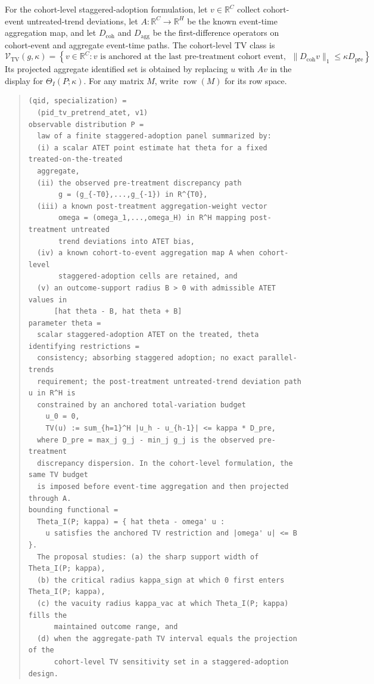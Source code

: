 \documentclass[11pt]{article}
\newcommand{\R}{\mathbb{R}}
\theoremstyle{definition}
\theoremstyle{plain}
\theoremstyle{remark}
\begin{document}
For the cohort-level staggered-adoption formulation, let \(v\in\R^{C}\) collect cohort-event untreated-trend deviations, let \(A:\R^C\to\R^H\) be the known event-time aggregation map, and let \(D_{\mathrm{coh}}\) and \(D_{\mathrm{agg}}\) be the first-difference operators on cohort-event and aggregate event-time paths. The cohort-level TV class is
\[
\mathcal V_{\mathrm{TV}}(g,\kappa)
=
\left\{
v\in\R^C:
v \text{ is anchored at the last pre-treatment cohort event, }\;
\|D_{\mathrm{coh}}v\|_1\le \kappa D_{\mathrm{pre}}
\right\}.
\]
Its projected aggregate identified set is obtained by replacing \(u\) with \(Av\) in the display for \(\Theta_I(P;\kappa)\). For any matrix \(M\), write \(\operatorname{row}(M)\) for its row space.

\begin{quote}
\begin{verbatim}
(qid, specialization) =
  (pid_tv_pretrend_atet, v1)
observable distribution P =
  law of a finite staggered-adoption panel summarized by:
  (i) a scalar ATET point estimate hat theta for a fixed treated-on-the-treated
  aggregate,
  (ii) the observed pre-treatment discrepancy path
       g = (g_{-T0},...,g_{-1}) in R^{T0},
  (iii) a known post-treatment aggregation-weight vector
       omega = (omega_1,...,omega_H) in R^H mapping post-treatment untreated
       trend deviations into ATET bias,
  (iv) a known cohort-to-event aggregation map A when cohort-level
       staggered-adoption cells are retained, and
  (v) an outcome-support radius B > 0 with admissible ATET values in
      [hat theta - B, hat theta + B]
parameter theta =
  scalar staggered-adoption ATET on the treated, theta
identifying restrictions =
  consistency; absorbing staggered adoption; no exact parallel-trends
  requirement; the post-treatment untreated-trend deviation path u in R^H is
  constrained by an anchored total-variation budget
    u_0 = 0,
    TV(u) := sum_{h=1}^H |u_h - u_{h-1}| <= kappa * D_pre,
  where D_pre = max_j g_j - min_j g_j is the observed pre-treatment
  discrepancy dispersion. In the cohort-level formulation, the same TV budget
  is imposed before event-time aggregation and then projected through A.
bounding functional =
  Theta_I(P; kappa) = { hat theta - omega' u :
    u satisfies the anchored TV restriction and |omega' u| <= B }.
  The proposal studies: (a) the sharp support width of Theta_I(P; kappa),
  (b) the critical radius kappa_sign at which 0 first enters Theta_I(P; kappa),
  (c) the vacuity radius kappa_vac at which Theta_I(P; kappa) fills the
      maintained outcome range, and
  (d) when the aggregate-path TV interval equals the projection of the
      cohort-level TV sensitivity set in a staggered-adoption design.
\end{verbatim}
\end{quote}
\end{document}
